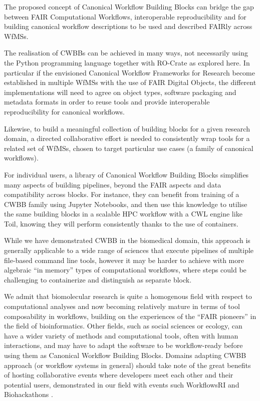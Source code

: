 The proposed concept of Canonical Workflow Building Blocks can bridge
the gap between FAIR Computational Workflows, interoperable
reproducibility and for building canonical workflow descriptions to be
used and described FAIRly across WfMSs.

The realisation of CWBBs can be achieved in many ways, not necessarily
using the Python programming language together with RO-Crate as explored
here. In particular if the envisioned Canonical Workflow Frameworks for
Research become established in multiple WfMSs with the use of FAIR
Digital Objects, the different implementations will need to agree on
object types, software packaging and metadata formats in order to reuse
tools and provide interoperable reproducibility for canonical workflows.

Likewise, to build a meaningful collection of building blocks for a
given research domain, a directed collaborative effort is needed to
consistently wrap tools for a related set of WfMSs, chosen to target
particular use cases (a family of canonical workflows).

For individual users, a library of Canonical Workflow Building Blocks
simplifies many aspects of building pipelines, beyond the FAIR aspects
and data compatibility across blocks. For instance, they can benefit
from training of a CWBB family using Jupyter Notebooks, and then use
this knowledge to utilise the same building blocks in a scalable HPC
workflow with a CWL engine like Toil, knowing they will perform
consistently thanks to the use of containers.

While we have demonstrated CWBB in the biomedical domain, this approach
is generally applicable to a wide range of sciences that execute
pipelines of multiple file-based command line tools, however it may be
harder to achieve with more algebraic ``in memory'' types of
computational workflows, where steps could be challenging to
containerize and distinguish as separate block.

We admit that biomolecular research is quite a homogenous field with
respect to computational analyses and now becoming relatively mature in
terms of tool composability in workflows, building on the experiences of
the ``FAIR pioneers'' in the field of bioinformatics. Other fields, such
as social sciences or ecology, can have a wider variety of methods and
computational tools, often with human interactions, and may have to
adapt the software to be workflow-ready \cite{ch6-37} before using them as
Canonical Workflow Building Blocks. Domains adapting CWBB approach (or
workflow systems in general) should take note of the great benefits of
hosting collaborative events where developers meet each other and their
potential users, demonstrated in our field with events such WorkflowsRI
\cite{ch6-39} and Biohackathons \cite{ch6-40}.

